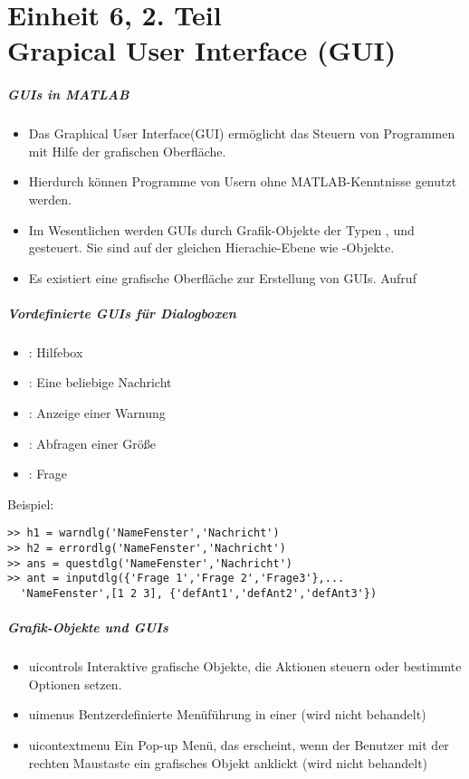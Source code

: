 \part{Einheit  6, 2. Teil\\Grapical User Interface (GUI)}
%
%
\begin{frame}[fragile]\frametitle{GUIs in MATLAB}
\begin{itemize}
\item Das Graphical User Interface(GUI) erm\"oglicht das Steuern von Programmen
  mit Hilfe der grafischen Oberfl\"ache. 
\item Hierdurch k\"onnen Programme von Usern ohne MATLAB-Kenntnisse genutzt
  werden. 
\item Im Wesentlichen werden GUIs durch Grafik-Objekte der Typen
  ,  und  gesteuert. Sie
  sind auf der gleichen Hierachie-Ebene wie -Objekte. 
\item Es existiert eine grafische Oberfl\"ache zur Erstellung von GUIs. Aufruf
  \alert{ }
\end{itemize}
\end{frame}
%
%
\begin{frame}[fragile]\frametitle{Vordefinierte GUIs f\"ur \newline Dialogboxen}
\begin{itemize}
\item { \blue {}}: Hilfebox
\item { \blue {}}: Eine beliebige Nachricht
\item { \blue {}}: Anzeige einer Warnung
\item { \blue {}}: Abfragen einer Gr\"o{\ss}e
\item { \blue {}}: Frage
\end{itemize}
\alert{Beispiel:}
\begin{lstlisting}
>> h1 = warndlg('NameFenster','Nachricht')
>> h2 = errordlg('NameFenster','Nachricht')
>> ans = questdlg('NameFenster','Nachricht')
>> ant = inputdlg({'Frage 1','Frage 2','Frage3'},...
  'NameFenster',[1 2 3], {'defAnt1','defAnt2','defAnt3'})
\end{lstlisting}
\end{frame}
%
%
\begin{frame}[fragile]\frametitle{Grafik-Objekte und GUIs}
\begin{itemize}
\item \alert\alert{ uicontrols}\newline
Interaktive grafische Objekte, die Aktionen steuern oder bestimmte Optionen setzen.
\item \alert\alert{ uimenus}\newline
Bentzerdefinierte Men\"uf\"uhrung in einer  (wird nicht behandelt)
\item \alert\alert{ uicontextmenu}\newline
Ein Pop-up Men\"u, das erscheint, wenn der Benutzer mit der rechten Maustaste
ein grafisches Objekt anklickt (wird nicht behandelt)
\end{itemize}
\end{frame}
